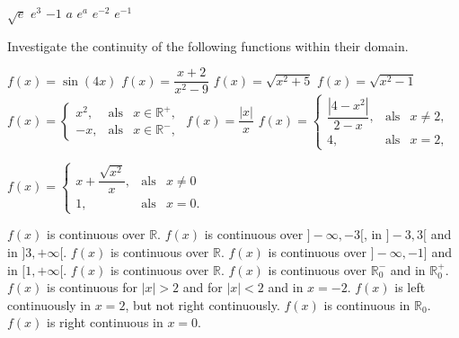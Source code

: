 \begin{Answer}\phantom{}
    \begin{multicols}{3}
		
		\Question $\sqrt{e}$
		\Question $e^3$
		\Question $-1$
		\Question $a$
		\ifanalysis
		\Question $e^{a}$ 
		\Question $e^{-2}$ 
		\Question $e^{-1}$  
		\fi
		\EndCurrentQuestion 
	\end{multicols}
\end{Answer}



\begin{Exercise} Investigate the continuity of the following functions within their domain. 
 \begin{multicols}{2}
	\Question[difficulty = 1] $f(x)=\sin (4x)$
	\Question[difficulty = 1] $f(x)=\dfrac{x+2}{x^2-9}$
	\Question[difficulty = 1] $f(x)=\sqrt{x^2+5}$
	\Question[difficulty = 1] $f(x)=\sqrt{x^2-1}$
	\Question[difficulty = 1] $f(x)=\left\{
	\begin{array}{lcl}
	x^2, & \mbox{als} & x\in \mathbb{R}^+, \\
	-x,  & \mbox{als} & x\in \mathbb{R}^-,
	\end{array}\right.$
	\Question[difficulty = 1] $f(x)=\dfrac{|x|}{x}$
    \ifanalysis
        \Question[difficulty = 1] $f(x)=\left\{
    	\begin{array}{lcl}
    	\dfrac{|4-x^2|}{2-x},  & \mbox{als} & x\neq 2, \\
    	4,  & \mbox{als} & x = 2,
    	\end{array}\right.$
    
        \Question[difficulty = 1] $f(x)=\left\{
    	\begin{array}{lcl}
    	x + \dfrac{\sqrt{x^2}}{x},  & \mbox{als} & x\neq 0 \\
    	1,  & \mbox{als} & x = 0.
    	\end{array}\right.$
    \fi
    \EndCurrentQuestion
\end{multicols}

\end{Exercise}

\begin{Answer}\phantom{}
    
		\Question $f(x)$ is continuous over $\mathbb{R}$.
		\Question $f(x)$ is continuous over $]-\infty , -3[$, in $]-3,3[$ and in $]3,+\infty[$.
		\Question $f(x)$ is continuous over $\mathbb{R}$.
		\Question $f(x)$ is continuous over $]-\infty , -1]$ and in $[1,+\infty[$. 
		\Question $f(x)$ is continuous over $\mathbb{R}$.
		\Question $f(x)$ is continuous over $\mathbb{R}_0^-$ and in $\mathbb{R}_0^+$.
		\ifanalysis
        \Question $f(x)$ is continuous for $|x| > 2$ and for $|x| < 2$ and in $x=-2$. $f(x)$ is left continuously in $x=2$, but not right continuously. 
        \Question $f(x)$ is continuous in $\mathbb{R}_0$. $f(x)$ is right continuous in $x=0$. 
        \fi
\end{Answer}



